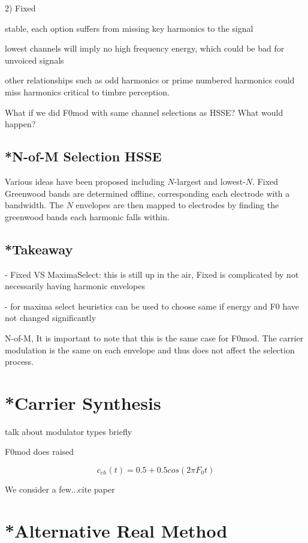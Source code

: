 \documentclass [11pt, proquest] {uwthesis}[2015/03/03]
\begin{document}
2) Fixed

stable, each option suffers from missing key harmonics to the signal

lowest channels will imply no high frequency energy, which could be bad for unvoiced signals

other relationships such as odd harmonics or prime numbered harmonics could miss harmonics critical to timbre perception.

What if we did F0mod with same channel selections as HSSE?  What would happen?

\subsection{*N-of-M Selection HSSE}

Various ideas have been proposed including $N$-largest and lowest-$N$.  Fixed Greenwood bands are determined offline, corresponding each electrode with a bandwidth.  The $N$ envelopes are then mapped to electrodes by finding the greenwood bands each harmonic falls within.


\subsection{*Takeaway}

 - Fixed VS MaximaSelect: this is still up in the air, Fixed is complicated by not necessarily having harmonic envelopes
 
 - for maxima select heuristics can be used to choose same if energy and F0 have not changed significantly
 


N-of-M, It is important to note that this is the same case for F0mod.  The carrier modulation is the same on each envelope and thus does not affect the selection process.
 
 


\section{*Carrier Synthesis}

talk about modulator types briefly

F0mod does raised

$$c_{ch}(t) = 0.5 + 0.5cos(2\pi F_0t)$$


We consider a few...cite paper

\section{*Alternative Real Method}
\end{document}
